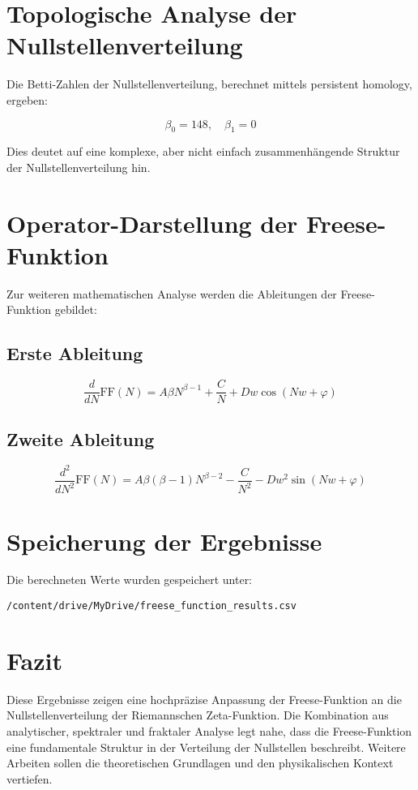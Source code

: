 \documentclass[a4paper,12pt]{article}
\begin{document}
\section{Topologische Analyse der Nullstellenverteilung}
Die Betti-Zahlen der Nullstellenverteilung, berechnet mittels persistent homology, ergeben:

\begin{equation}
    \beta_0 = 148, \quad \beta_1 = 0
\end{equation}

Dies deutet auf eine komplexe, aber nicht einfach zusammenhängende Struktur der Nullstellenverteilung hin.

\section{Operator-Darstellung der Freese-Funktion}
Zur weiteren mathematischen Analyse werden die Ableitungen der Freese-Funktion gebildet:

\subsection{Erste Ableitung}
\begin{equation}
    \frac{d}{dN} \text{FF}(N) = A \beta N^{\beta-1} + \frac{C}{N} + D w \cos(N w + \varphi)
\end{equation}

\subsection{Zweite Ableitung}
\begin{equation}
    \frac{d^2}{dN^2} \text{FF}(N) = A \beta (\beta - 1) N^{\beta-2} - \frac{C}{N^2} - D w^2 \sin(N w + \varphi)
\end{equation}

\section{Speicherung der Ergebnisse}
Die berechneten Werte wurden gespeichert unter:

\begin{verbatim}
/content/drive/MyDrive/freese_function_results.csv
\end{verbatim}

\section{Fazit}
Diese Ergebnisse zeigen eine hochpräzise Anpassung der Freese-Funktion an die Nullstellenverteilung der Riemannschen Zeta-Funktion. Die Kombination aus analytischer, spektraler und fraktaler Analyse legt nahe, dass die Freese-Funktion eine fundamentale Struktur in der Verteilung der Nullstellen beschreibt. Weitere Arbeiten sollen die theoretischen Grundlagen und den physikalischen Kontext vertiefen.
\end{document}
